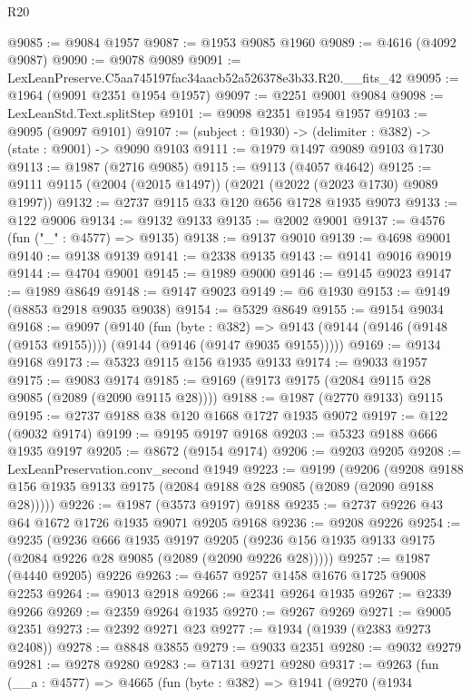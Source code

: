 \begin{lexlean}{R20}
\begin{coremodule}
@9085 := @9084 @1957
@9087 := @1953 @9085 @1960
@9089 := @4616 (@4092 @9087)
@9090 := @9078 @9089
@9091 := LexLeanPreserve.C5aa745197fac34aacb52a526378e3b33.R20.__fits_42
@9095 := @1964 (@9091 @2351 @1954 @1957)
@9097 := @2251 @9001 @9084
@9098 := LexLeanStd.Text.splitStep
@9101 := @9098 @2351 @1954 @1957
@9103 := @9095 (@9097 @9101)
@9107 := (subject : @1930) -> (delimiter : @382) -> (state : @9001) -> @9090 @9103
@9111 := @1979 @1497 @9089 @9103 @1730
@9113 := @1987 (@2716 @9085)
@9115 := @9113 (@4057 @4642)
@9125 := @9111 @9115 (@2004 (@2015 @1497)) (@2021 (@2022 (@2023 @1730) @9089 @1997))
@9132 := @2737 @9115 @33 @120 @656 @1728 @1935 @9073
@9133 := @122 @9006
@9134 := @9132 @9133
@9135 := @2002 @9001
@9137 := @4576 (fun ("_" : @4577) => @9135)
@9138 := @9137 @9010
@9139 := @4698 @9001
@9140 := @9138 @9139
@9141 := @2338 @9135
@9143 := @9141 @9016 @9019
@9144 := @4704 @9001
@9145 := @1989 @9000
@9146 := @9145 @9023
@9147 := @1989 @8649
@9148 := @9147 @9023
@9149 := @6 @1930
@9153 := @9149 (@8853 @2918 @9035 @9038)
@9154 := @5329 @8649
@9155 := @9154 @9034
@9168 := @9097
    (@9140
      (fun (byte : @382) =>
      @9143 (@9144 (@9146 (@9148 (@9153 @9155)))) (@9144 (@9146 (@9147 @9035 @9155)))))
@9169 := @9134 @9168
@9173 := @5323 @9115 @156 @1935 @9133
@9174 := @9033 @1957
@9175 := @9083 @9174
@9185 := @9169 (@9173 @9175 (@2084 @9115 @28 @9085 (@2089 (@2090 @9115 @28))))
@9188 := @1987 (@2770 @9133) @9115
@9195 := @2737 @9188 @38 @120 @1668 @1727 @1935 @9072
@9197 := @122 (@9032 @9174)
@9199 := @9195 @9197 @9168
@9203 := @5323 @9188 @666 @1935 @9197
@9205 := @8672 (@9154 @9174)
@9206 := @9203 @9205
@9208 := LexLeanPreservation.conv_second @1949
@9223 := @9199
    (@9206 (@9208 @9188 @156 @1935 @9133 @9175 (@2084 @9188 @28 @9085 (@2089 (@2090 @9188 @28)))))
@9226 := @1987 (@3573 @9197) @9188
@9235 := @2737 @9226 @43 @64 @1672 @1726 @1935 @9071 @9205 @9168
@9236 := @9208 @9226
@9254 := @9235
    (@9236
      @666
      @1935
      @9197
      @9205
      (@9236 @156 @1935 @9133 @9175 (@2084 @9226 @28 @9085 (@2089 (@2090 @9226 @28)))))
@9257 := @1987 (@4440 @9205) @9226
@9263 := @4657 @9257 @1458 @1676 @1725 @9008 @2253
@9264 := @9013 @2918
@9266 := @2341 @9264 @1935
@9267 := @2339 @9266
@9269 := @2359 @9264 @1935
@9270 := @9267 @9269
@9271 := @9005 @2351
@9273 := @2392 @9271 @23
@9277 := @1934 (@1939 (@2383 @9273 @2408))
@9278 := @8848 @3855
@9279 := @9033 @2351
@9280 := @9032 @9279
@9281 := @9278 @9280
@9283 := @7131 @9271 @9280
@9317 := @9263
    (fun (__a : @4577) =>
    @4665
      (fun (byte : @382) =>
      @1941
        (@9270
          (@1934

\end{coremodule}
\end{lexlean}
